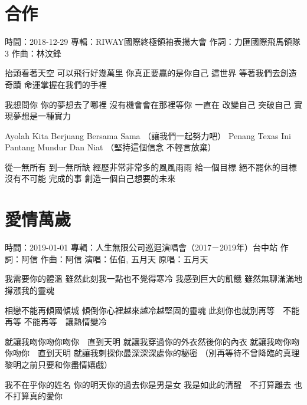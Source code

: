 \documentclass[UTF8,a4paper,oneside,twocolumn,12pt]{ctexbook}
\newcommand{\infopair}[2]{\textbullet #1：#2}
\newcommand{\zc}[1][伍佰]{\infopair{作詞}{#1}}
\newcommand{\zq}[1][伍佰]{\infopair{作曲}{#1}}
\newcommand{\zj}[1]{\infopair{專輯}{#1}}
\newcommand{\yc}[1]{\infopair{原唱}{#1}}
\newcommand{\sj}[1]{\infopair{時間}{#1}}
\newenvironment{info}{\begin{flushleft}\kaishu
	}
	{\end{flushleft}\normalsize\yahei\par}
\newenvironment{lyric}{
	}
{}
\begin{document}
\section{合作}%
\begin{info}
	\sj{2018-12-29}
	\zj{RIWAY國際終極領袖表揚大會}
	\zc[力匯國際飛馬領隊3]
	\zq[林汶鋒]
\end{info}
\begin{lyric}
	抬頭看著天空 可以飛行好幾萬里
	你真正要贏的是你自己
	這世界 等著我們去創造奇蹟
	命運掌握在我們的手裡

	我想問你 你的夢想去了哪裡
	沒有機會會在那裡等你
	一直在 改變自己 突破自己
	實現夢想是一種實力

	Ayolah Kita Berjuang Bersama Sama
	（讓我們一起努力吧）
	Penang Texas Ini Pantang Mundur Dan Niat
	（堅持這個信念 不輕言放棄）

	從一無所有 到一無所缺
	經歷非常非常多的風風雨雨
	給一個目標 絕不罷休的目標
	沒有不可能 完成的事
	創造一個自己想要的未來
\end{lyric}

\section{愛情萬歲}%
\begin{info}
	\sj{2019-01-01}
	\zj{人生無限公司巡迴演唱會（2017－2019年）台中站}
	\zc[阿信]
	\zq[阿信]
	\infopair{演唱}{伍佰, 五月天}
	\yc{五月天}
\end{info}
\begin{lyric}
	我需要你的體溫
	雖然此刻我一點也不覺得寒冷
	我感到巨大的飢餓
	雖然無聊滿滿地撐漲我的靈魂

	相戀不能再傾國傾城
	傾倒你心裡越來越冷越堅固的靈魂
	此刻你也就別再等　不能再等
	不能再等　讓熱情變冷

	就讓我吻你吻你吻你　直到天明
	就讓我穿過你的外衣然後你的內衣
	就讓我吻你吻你吻你　直到天明
	就讓我刺探你最深深深處你的秘密
	（別再等待不曾降臨的真理
	黎明之前只要和你盡情嬉戲）

	我不在乎你的姓名
	你的明天你的過去你是男是女
	我是如此的清醒　不打算離去
	也不打算真的愛你
\end{lyric}
\end{document}
